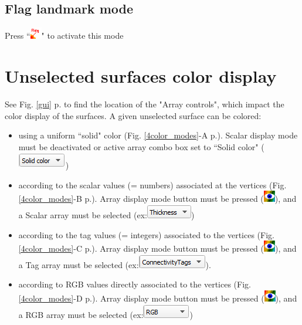 \subsection{Flag landmark mode}	
Press ``\includegraphics[scale=0.7]{images/04/flag_landmarks.png}" to activate this mode


 \section{Unselected surfaces color display}
See Fig. \ref{gui} p.\pageref{gui} to find the location of the "Array controls", which impact the color display of the surfaces.
 A given unselected surface can be colored: 
\begin{itemize}
\item using a uniform ``solid" color (Fig. \ref{4color_modes}-A p.\pageref{4color_modes}). Scalar display mode must be deactivated or active array combo box set to ``Solid color" (\includegraphics[scale=0.5]{images/04/scalarcombo_solidcolor.png})
\item	according to the scalar values (= numbers) associated at the vertices (Fig. \ref{4color_modes}-B p.\pageref{4color_modes}). Array display mode button must be pressed (\includegraphics[scale=0.7]{images/04/show_color_scale.png}), and a Scalar array must be selected (ex:\includegraphics[scale=0.5]{images/04/scalarcombo_scalar.png})
\item according to the tag values (= integers) associated to the vertices (Fig. \ref{4color_modes}-C p.\pageref{4color_modes}). Array display mode button must be pressed (\includegraphics[scale=0.7]{images/04/show_color_scale.png}), and a Tag array must be selected (ex:\includegraphics[scale=0.5]{images/04/scalarcombo_tag.png}).
\item	according to RGB values directly associated to the vertices (Fig. \ref{4color_modes}-D p.\pageref{4color_modes}). Array display mode button must be pressed (\includegraphics[scale=0.7]{images/04/show_color_scale.png}), and a RGB array must be selected (ex:\includegraphics[scale=0.5]{images/04/scalarcombo_rgb.png}) 
\end{itemize}

